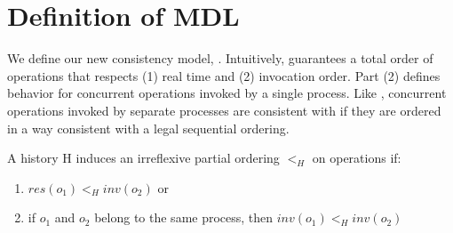 \section{Definition of MDL}

\label{sec:definition}

We define our new consistency model, \mdl. Intuitively, \md guarantees a total order of operations that respects (1) real time and (2) invocation order. Part (2) defines behavior for concurrent operations invoked by a single process. Like \sd, concurrent operations invoked by separate processes are consistent with \md if they are ordered in a way consistent with a legal sequential ordering.


A history H induces an irreflexive partial ordering $<_H$ on operations if:
\begin{enumerate}
    \item $res(o_1) <_H inv(o_2)$ or
    \item if $o_1$ and $o_2$ belong to the same process, then $inv(o_1) <_H inv(o_2)$
\end{enumerate}